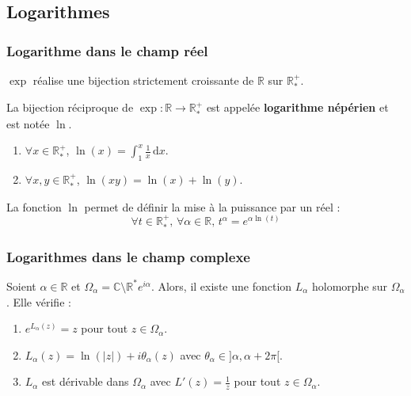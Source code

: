   \subsection{Logarithmes}

  \subsubsection{Logarithme dans le champ réel}


  \begin{proposition}
    $\exp$ réalise une bijection strictement croissante de $\mathbb{R}$ sur $\mathbb{R}_*^+$.
  \end{proposition}

  \begin{definition}
    La bijection réciproque de $\exp : \mathbb{R} \rightarrow \mathbb{R}_*^+$ est appelée \textbf{logarithme népérien} et est notée $\ln$.
  \end{definition}

  \begin{theorem}
    \begin{enumerate}[label={\bfseries(\roman*)}]
      \item $\forall x \in \mathbb{R}_*^+$, $\ln(x) = \int_1^x \frac{1}{x} \, \mathrm{d}x$.
      \item $\forall x, y \in \mathbb{R}_*^+$, $\ln(xy) = \ln(x) + \ln(y)$.
    \end{enumerate}
  \end{theorem}

  \begin{remark}
    La fonction $\ln$ permet de définir la mise à la puissance par un réel :
    \[ \forall t \in \mathbb{R}^+_*, \, \forall \alpha \in \mathbb{R}, \, t^\alpha = e^{\alpha \ln(t)} \]
  \end{remark}

  \subsubsection{Logarithmes dans le champ complexe}


  \begin{theorem}
    Soient $\alpha \in \mathbb{R}$ et $\Omega_\alpha = \mathbb{C} \setminus \mathbb{R}^* e^{i\alpha}$. Alors, il existe une fonction $L_\alpha$ holomorphe sur $\Omega_\alpha$. Elle vérifie :
    \begin{enumerate}[label={\bfseries(\roman*)}]
      \item $e^{L_\alpha(z)} = z$ pour tout $z \in \Omega_\alpha$.
      \item $L_\alpha(z) = \ln(\vert z \vert) + i\theta_\alpha(z)$ avec $\theta_\alpha \in ]\alpha, \alpha + 2\pi[$.
      \item $L_\alpha$ est dérivable dans $\Omega_\alpha$ avec $L'(z) = \frac{1}{z}$ pour tout $z \in \Omega_\alpha$.
    \end{enumerate}
  \end{theorem}

